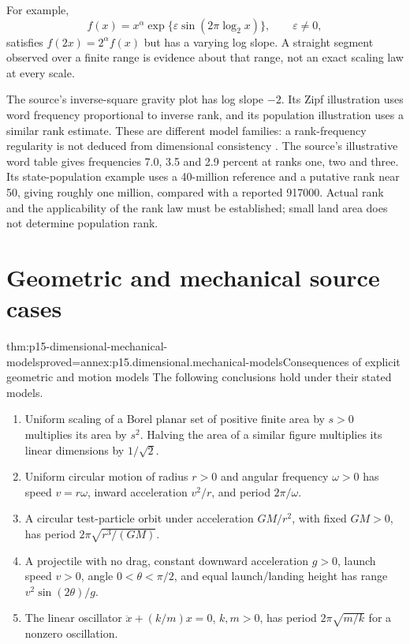For example,
\[
 f(x)=x^\alpha\exp\{\varepsilon\sin(2\pi\log_2x)\},\qquad\varepsilon\ne0,
\]
satisfies \(f(2x)=2^\alpha f(x)\) but has a varying log slope.
A straight segment observed over a finite range is evidence about that
range, not an exact scaling law at every scale.

The source's inverse-square gravity plot has log slope \(-2\).
Its Zipf illustration uses word frequency proportional to inverse rank,
and its population illustration uses a similar rank estimate.
These are different model families: a rank-frequency regularity is not
deduced from dimensional consistency \cite[4.5]{Mahajan2014Insight}.
The source's illustrative word table gives frequencies 7.0, 3.5 and 2.9
percent at ranks one, two and three. Its state-population example uses a
40-million reference and a putative rank near 50, giving roughly one
million, compared with a reported 917000. Actual rank and the applicability
of the rank law must be established; small land area does not determine
population rank.

\section{Geometric and mechanical source cases}
\label{sec:p15-dimensional-mechanical}

\begin{hbtheorem}{thm:p15-dimensional-mechanical-models}{proved=annex:p15.dimensional.mechanical-models}{Consequences of explicit geometric and motion models}
The following conclusions hold under their stated models.
\begin{enumerate}
\item Uniform scaling of a Borel planar set of positive finite area by \(s>0\) multiplies its area by
\(s^2\). Halving the area of a similar figure multiplies its linear dimensions
by \(1/\sqrt2\).
\item Uniform circular motion of radius \(r>0\) and angular frequency \(\omega>0\)
has speed \(v=r\omega\), inward acceleration \(v^2/r\), and period
\(2\pi/\omega\).
\item A circular test-particle orbit under acceleration \(GM/r^2\), with
fixed \(GM>0\), has period \(2\pi\sqrt{r^3/(GM)}\).
\item A projectile with no drag, constant downward acceleration \(g>0\),
launch speed \(v>0\), angle \(0<\theta<\pi/2\), and equal launch/landing
height has range \(v^2\sin(2\theta)/g\).
\item The linear oscillator \(\ddot x+(k/m)x=0\), \(k,m>0\), has
period \(2\pi\sqrt{m/k}\) for a nonzero oscillation.
\end{enumerate}
\end{hbtheorem}

